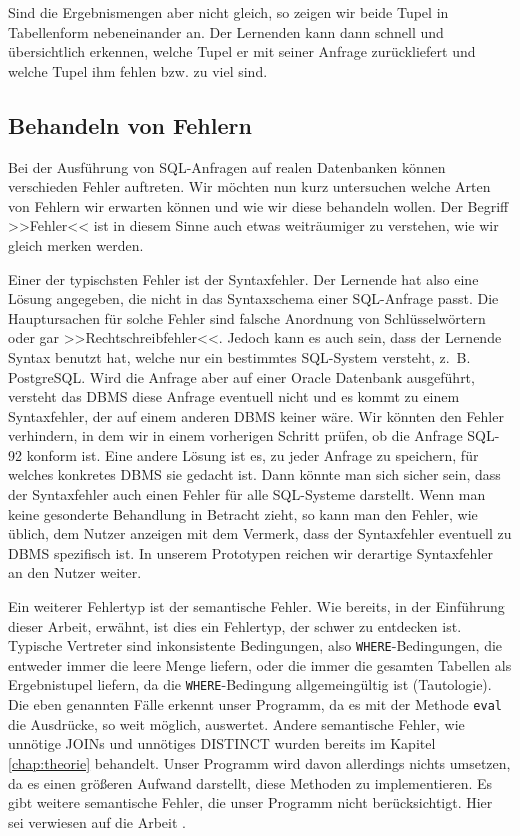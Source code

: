 Sind die Ergebnismengen aber nicht gleich, so zeigen wir beide Tupel in Tabellenform nebeneinander an. Der Lernenden kann dann schnell und übersichtlich erkennen, welche Tupel er mit seiner Anfrage zurückliefert und welche Tupel ihm fehlen bzw. zu viel sind.

\subsection{Behandeln von Fehlern}

Bei der Ausführung von SQL-Anfragen auf realen Datenbanken können verschieden Fehler auftreten. Wir möchten nun kurz untersuchen welche Arten von Fehlern wir erwarten können und wie wir diese behandeln wollen. Der Begriff >>Fehler<< ist in diesem Sinne auch etwas weiträumiger zu verstehen, wie wir gleich merken werden.

Einer der typischsten Fehler ist der Syntaxfehler. Der Lernende hat also eine Lösung angegeben, die nicht in das Syntaxschema einer SQL-Anfrage passt. Die Hauptursachen für solche Fehler sind falsche Anordnung von Schlüsselwörtern oder gar >>Rechtschreibfehler<<. Jedoch kann es auch sein, dass der Lernende Syntax benutzt hat, welche nur ein bestimmtes SQL-System versteht, \mbox{z. B.} PostgreSQL. Wird die Anfrage aber auf einer Oracle Datenbank ausgeführt, versteht das DBMS diese Anfrage eventuell nicht und es kommt zu einem Syntaxfehler, der auf einem anderen DBMS keiner wäre. Wir könnten den Fehler verhindern, in dem wir in einem vorherigen Schritt prüfen, ob die Anfrage SQL-92 konform ist. Eine andere Lösung ist es, zu jeder Anfrage zu speichern, für welches konkretes DBMS sie gedacht ist. Dann könnte man sich sicher sein, dass der Syntaxfehler auch einen Fehler für alle SQL-Systeme darstellt. Wenn man keine gesonderte Behandlung in Betracht zieht, so kann man den Fehler, wie üblich, dem Nutzer anzeigen mit dem Vermerk, dass der Syntaxfehler eventuell zu DBMS spezifisch ist. In unserem Prototypen reichen wir derartige Syntaxfehler an den Nutzer weiter.

Ein weiterer Fehlertyp ist der semantische Fehler. Wie bereits, in der Einführung dieser Arbeit, erwähnt, ist dies ein Fehlertyp, der schwer zu entdecken ist. Typische Vertreter sind inkonsistente Bedingungen, also \verb|WHERE|-Bedingungen, die entweder immer die leere Menge liefern, oder die immer die gesamten Tabellen als Ergebnistupel liefern, da die \verb|WHERE|-Bedingung allgemeingültig ist (Tautologie). Die eben genannten Fälle erkennt unser Programm, da es mit der Methode \verb|eval| die Ausdrücke, so weit möglich, auswertet. Andere semantische Fehler, wie unnötige JOINs und unnötiges DISTINCT wurden bereits im Kapitel \ref{chap:theorie} behandelt. Unser Programm wird davon allerdings nichts umsetzen, da es einen größeren Aufwand darstellt, diese Methoden zu implementieren. Es gibt weitere semantische Fehler, die unser Programm nicht berücksichtigt. Hier sei verwiesen auf die Arbeit \cite{brass2}. 

